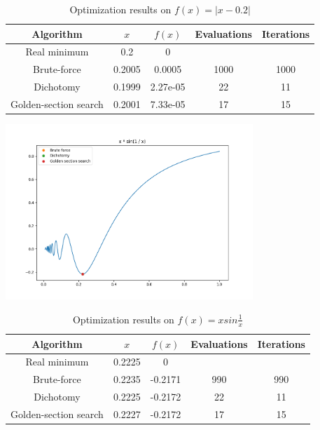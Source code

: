 \begin{table}[h!]
    \begin{center}
        \caption{Optimization results on $f(x) = |x - 0.2|$}
        \begin{tabular}{|c|c|c|c|c|}
            \textbf{Algorithm} & \textbf{$x$} & \textbf{$f(x)$} & \textbf{Evaluations} & \textbf{Iterations}\\
            \hline
            Real minimum & 0.2 & 0 & &\\
            Brute-force & 0.2005 & 0.0005 & 1000 & 1000 \\
            Dichotomy & 0.1999 & 2.27e-05 & 22 & 11 \\
            Golden-section search & 0.2001 & 7.33e-05 & 17 & 15
        \end{tabular}
    \end{center}
\end{table}


\begin{center}
    \includegraphics[width=0.7\textwidth]{../results/xsin.png}
\end{center}

\begin{table}[h!]
    \begin{center}
        \caption{Optimization results on $f(x) = x sin\frac{1}{x}$}
        \begin{tabular}{|c|c|c|c|c|}
            \textbf{Algorithm} & \textbf{$x$} & \textbf{$f(x)$} & \textbf{Evaluations} & \textbf{Iterations}\\
            \hline
            Real minimum & 0.2225 & 0 & &\\
            Brute-force & 0.2235 & -0.2171 & 990 & 990 \\
            Dichotomy & 0.2225 & -0.2172 & 22 & 11 \\
            Golden-section search & 0.2227 & -0.2172 & 17 & 15
        \end{tabular}
    \end{center}
\end{table}

